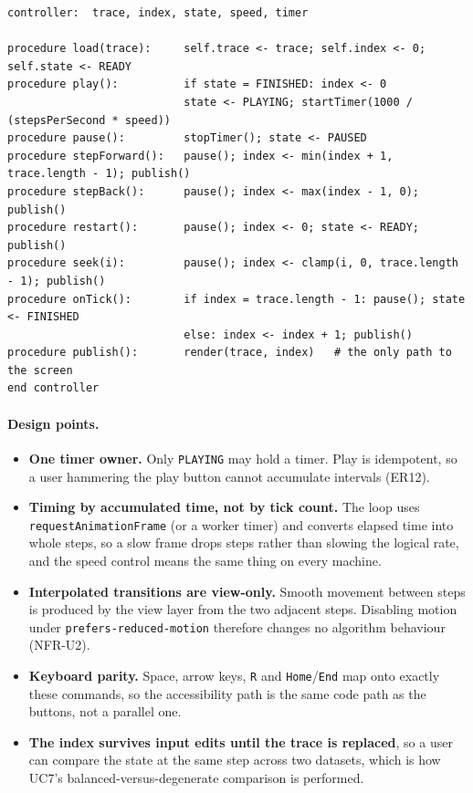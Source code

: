 \documentclass[11pt,a4paper]{article}
\newcommand{\ct}[1]{\texttt{#1}}
\begin{document}
\begin{lstlisting}[style=pseudo,caption={The playback controller. It owns the only timer in
the application, and every command is a clamped index operation, which is why stepping back
is exact and rapid input cannot start two animations.},label={lst:controller}]
controller:  trace, index, state, speed, timer

procedure load(trace):     self.trace <- trace; self.index <- 0; self.state <- READY
procedure play():          if state = FINISHED: index <- 0
                           state <- PLAYING; startTimer(1000 / (stepsPerSecond * speed))
procedure pause():         stopTimer(); state <- PAUSED
procedure stepForward():   pause(); index <- min(index + 1, trace.length - 1); publish()
procedure stepBack():      pause(); index <- max(index - 1, 0); publish()
procedure restart():       pause(); index <- 0; state <- READY; publish()
procedure seek(i):         pause(); index <- clamp(i, 0, trace.length - 1); publish()
procedure onTick():        if index = trace.length - 1: pause(); state <- FINISHED
                           else: index <- index + 1; publish()
procedure publish():       render(trace, index)   # the only path to the screen
end controller
\end{lstlisting}

\paragraph{Design points.}
\begin{itemize}[leftmargin=1.6em,itemsep=2pt]
  \item \textbf{One timer owner.} Only \ct{PLAYING} may hold a timer. Play is idempotent,
        so a user hammering the play button cannot accumulate intervals (ER12).
  \item \textbf{Timing by accumulated time, not by tick count.} The loop uses
        \ct{requestAnimationFrame} (or a worker timer) and converts elapsed time into whole
        steps, so a slow frame drops steps rather than slowing the logical rate, and the
        speed control means the same thing on every machine.
  \item \textbf{Interpolated transitions are view-only.} Smooth movement between steps is
        produced by the view layer from the two adjacent steps. Disabling motion under
        \ct{prefers-reduced-motion} therefore changes no algorithm behaviour (NFR-U2).
  \item \textbf{Keyboard parity.} Space, arrow keys, \ct{R} and \ct{Home}/\ct{End} map onto
        exactly these commands, so the accessibility path is the same code path as the
        buttons, not a parallel one.
  \item \textbf{The index survives input edits until the trace is replaced}, so a user can
        compare the state at the same step across two datasets, which is how UC7's
        balanced-versus-degenerate comparison is performed.
\end{itemize}
\end{document}
